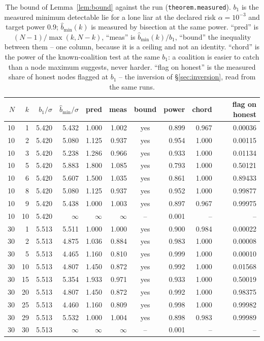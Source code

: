 \begin{table}[t]
\centering
\caption{The bound of Lemma~\ref{lem:bound} against the run (\texttt{theorem.measured}). $b_1$ is the measured minimum detectable lie for a lone liar at the declared risk $\alpha=10^{-3}$ and target power $0.9$; $\hat b_{\min}(k)$ is measured by bisection at the same power. ``pred'' is $(N-1)/\max(k,N-k)$, ``meas'' is $\hat b_{\min}(k)/b_1$, ``bound'' the inequality between them -- one column, because it is a ceiling and not an identity. ``chord'' is the power of the known-coalition test at the same $b_1$: a coalition is easier to catch than a node maximum suggests, never harder. ``flag on honest'' is the measured share of honest nodes flagged at $b_1$ -- the inversion of \S\ref{sec:inversion}, read from the same runs.}
\label{tab:measured}
\small
\begin{tabular}{@{}r r r r r r c r r r@{}}
\toprule
$N$ & $k$ & $b_1/\sigma$ & $\hat b_{\min}/\sigma$ & pred & meas & bound & power & chord & flag on honest \\
\midrule
10 & 1 & 5.420 & 5.432 & 1.000 & 1.002 & yes & 0.899 & 0.967 & 0.00036 \\
10 & 2 & 5.420 & 5.080 & 1.125 & 0.937 & yes & 0.954 & 1.000 & 0.00115 \\
10 & 3 & 5.420 & 5.238 & 1.286 & 0.966 & yes & 0.933 & 1.000 & 0.01134 \\
10 & 5 & 5.420 & 5.883 & 1.800 & 1.085 & yes & 0.793 & 1.000 & 0.50121 \\
10 & 6 & 5.420 & 5.607 & 1.500 & 1.035 & yes & 0.861 & 1.000 & 0.89433 \\
10 & 8 & 5.420 & 5.080 & 1.125 & 0.937 & yes & 0.952 & 1.000 & 0.99877 \\
10 & 9 & 5.420 & 5.438 & 1.000 & 1.003 & yes & 0.897 & 0.967 & 0.99975 \\
10 & 10 & 5.420 & $\infty$ & $\infty$ & $\infty$ & -- & 0.001 & -- & -- \\
30 & 1 & 5.513 & 5.511 & 1.000 & 1.000 & yes & 0.900 & 0.984 & 0.00022 \\
30 & 2 & 5.513 & 4.875 & 1.036 & 0.884 & yes & 0.983 & 1.000 & 0.00008 \\
30 & 5 & 5.513 & 4.465 & 1.160 & 0.810 & yes & 0.999 & 1.000 & 0.00010 \\
30 & 10 & 5.513 & 4.807 & 1.450 & 0.872 & yes & 0.992 & 1.000 & 0.01568 \\
30 & 15 & 5.513 & 5.354 & 1.933 & 0.971 & yes & 0.933 & 1.000 & 0.50019 \\
30 & 20 & 5.513 & 4.807 & 1.450 & 0.872 & yes & 0.992 & 1.000 & 0.98375 \\
30 & 25 & 5.513 & 4.460 & 1.160 & 0.809 & yes & 0.998 & 1.000 & 0.99982 \\
30 & 29 & 5.513 & 5.532 & 1.000 & 1.004 & yes & 0.898 & 0.983 & 0.99989 \\
30 & 30 & 5.513 & $\infty$ & $\infty$ & $\infty$ & -- & 0.001 & -- & -- \\
\bottomrule
\end{tabular}
\end{table}

